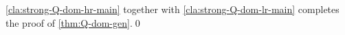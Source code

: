 \autoref{cla:strong-Q-dom-hr-main} together with \autoref{cla:strong-Q-dom-lr-main} completes the proof of \autoref{thm:Q-dom-gen}.\qed
















































































































































